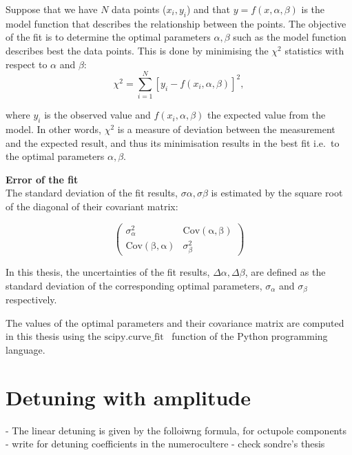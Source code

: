 Suppose that we have $N$ data points ($x_{i}, y_{i}$) and that $y=f(x,\alpha, \beta)$ is the model function that describes the relationship between the points. The objective of the fit is to determine the optimal parameters $\alpha, \beta$ such as the model function describes best the data points. This is done by minimising the $\chi^2$ statistics with respect to $\alpha$ and $\beta$:
\begin{equation}\label{eq:chi_square}
    \chi^2 = \sum_{i=1}^{N}[y_{i}-f(x_{i},\alpha, \beta)]^2,
\end{equation}

where $y_{i}$ is the observed value and $f(x_{i},\alpha, \beta)$ the expected value from the model. In other words, $\chi^2$ is a measure of deviation between the measurement and the expected result, and thus its minimisation results in the best fit i.e.\ to the optimal parameters $\alpha, \beta$.


\normalsize{\textbf{Error of the fit}}\\
The standard deviation of the fit results, $\sigma \alpha, \sigma \beta$ is estimated by the square root of the diagonal of their covariant matrix:

\begin{equation}\label{eq:cov_matrix_fit_results}
    \begin{pmatrix}
        \sigma_{\alpha}^2 & \mathrm{Cov(\alpha, \beta)}\\
        \mathrm{Cov(\beta, \alpha)} & \sigma_{\beta}^2
        \end{pmatrix}
\end{equation}

In this thesis, the uncertainties of the fit results, $\Delta \alpha, \Delta \beta$, are defined as the standard deviation of the corresponding optimal parameters, $\sigma_{\alpha}$ and  $\sigma_{\beta}$ respectively.

The values of the optimal parameters and their covariance matrix are computed in this thesis using the $\mathrm{scipy.curve \_ fit}$~\cite{scipy_curve_fit} function of the Python programming language.


\section{Detuning with amplitude}\label{app:detuning_with_amplitude}
- The linear detuning is given by the folloiwng formula, for octupole components
- write for detuning coefficients in the numerocultere
- check sondre's thesis

